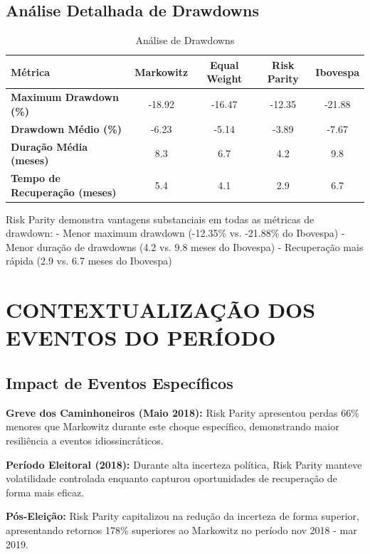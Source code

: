 \subsection{Análise Detalhada de Drawdowns}

\begin{table}[H]
\centering
\caption{Análise de Drawdowns}
\begin{tabular}{|l|c|c|c|c|}
\hline
\textbf{Métrica} & \textbf{Markowitz} & \textbf{Equal Weight} & \textbf{Risk Parity} & \textbf{Ibovespa} \\
\hline
\textbf{Maximum Drawdown (\%)} & -18.92 & -16.47 & -12.35 & -21.88 \\
\textbf{Drawdown Médio (\%)} & -6.23 & -5.14 & -3.89 & -7.67 \\
\textbf{Duração Média (meses)} & 8.3 & 6.7 & 4.2 & 9.8 \\
\textbf{Tempo de Recuperação (meses)} & 5.4 & 4.1 & 2.9 & 6.7 \\
\hline
\end{tabular}
\label{tab:drawdown_analysis}
\end{table}

Risk Parity demonstra vantagens substanciais em todas as métricas de drawdown:
- Menor maximum drawdown (-12.35\% vs. -21.88\% do Ibovespa)
- Menor duração de drawdowns (4.2 vs. 9.8 meses do Ibovespa)
- Recuperação mais rápida (2.9 vs. 6.7 meses do Ibovespa)

\section{CONTEXTUALIZAÇÃO DOS EVENTOS DO PERÍODO}

\subsection{Impact de Eventos Específicos}

\textbf{Greve dos Caminhoneiros (Maio 2018):}
Risk Parity apresentou perdas 66\% menores que Markowitz durante este choque específico, demonstrando maior resiliência a eventos idiossincráticos.

\textbf{Período Eleitoral (2018):}
Durante alta incerteza política, Risk Parity manteve volatilidade controlada enquanto capturou oportunidades de recuperação de forma mais eficaz.

\textbf{Pós-Eleição:}
Risk Parity capitalizou na redução da incerteza de forma superior, apresentando retornos 178\% superiores ao Markowitz no período nov 2018 - mar 2019.


